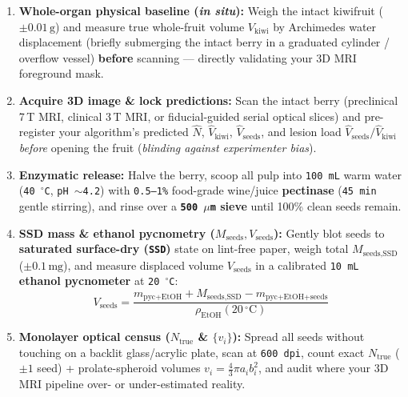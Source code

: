 \documentclass[10pt,a4paper]{article}
\begin{document}
\begin{protocolbox}
\begin{enumerate}
    \item \textbf{Whole-organ physical baseline (\textit{in situ}):} Weigh the intact kiwifruit ($\pm 0.01\,\text{g}$) and measure true whole-fruit volume $V_{\text{kiwi}}$ by Archimedes water displacement (briefly submerging the intact berry in a graduated cylinder / overflow vessel) \textbf{before} scanning --- directly validating your 3D MRI foreground mask.
    \item \textbf{Acquire 3D image \& lock predictions:} Scan the intact berry (preclinical 7\,T MRI, clinical 3\,T MRI, or fiducial-guided serial optical slices) and pre-register your algorithm's predicted $\hat{N}$, $\hat{V}_{\text{kiwi}}$, $\hat{V}_{\text{seeds}}$, and lesion load $\hat{V}_{\text{seeds}}/\hat{V}_{\text{kiwi}}$ \textit{before} opening the fruit (\textit{blinding against experimenter bias}).
    \item \textbf{Enzymatic release:} Halve the berry, scoop all pulp into \texttt{100\,mL} warm water (\texttt{40\,$^\circ$C}, \texttt{pH $\sim$4.2}) with \texttt{0.5--1\%} food-grade wine/juice \textbf{pectinase} (\texttt{45\,min} gentle stirring), and rinse over a \textbf{\texttt{500\,$\mu$m} sieve} until 100\% clean seeds remain.
    \item \textbf{SSD mass \& ethanol pycnometry ($M_{\text{seeds}}, V_{\text{seeds}}$):} Gently blot seeds to \textbf{saturated surface-dry (\texttt{SSD})} state on lint-free paper, weigh total $M_{\text{seeds,SSD}}$ ($\pm 0.1\,\text{mg}$), and measure displaced volume $V_{\text{seeds}}$ in a calibrated \texttt{10\,mL} \textbf{ethanol pycnometer} at \texttt{20\,$^\circ$C}:
    \[
        V_{\text{seeds}} = \frac{m_{\text{pyc+EtOH}} + M_{\text{seeds,SSD}} - m_{\text{pyc+EtOH+seeds}}}{\rho_{\text{EtOH}}(20\,^\circ\text{C})}
    \]
    \item \textbf{Monolayer optical census ($N_{\text{true}}$ \& $\{v_i\}$):} Spread all seeds without touching on a backlit glass/acrylic plate, scan at \texttt{600\,dpi}, count exact $N_{\text{true}}$ ($\pm 1$ seed) + prolate-spheroid volumes $v_i = \frac{4}{3}\pi a_i b_i^2$, and audit where your 3D MRI pipeline over- or under-estimated reality.
\end{enumerate}
\end{protocolbox}
\end{document}

